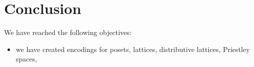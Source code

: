 
\section{Conclusion}\label{sec:Conclusion}

We have reached the following objectives:

\begin{itemize}


    \item we have created encodings for posets, lattices, distributive lattices, Priestley spaces, 
\end{itemize}